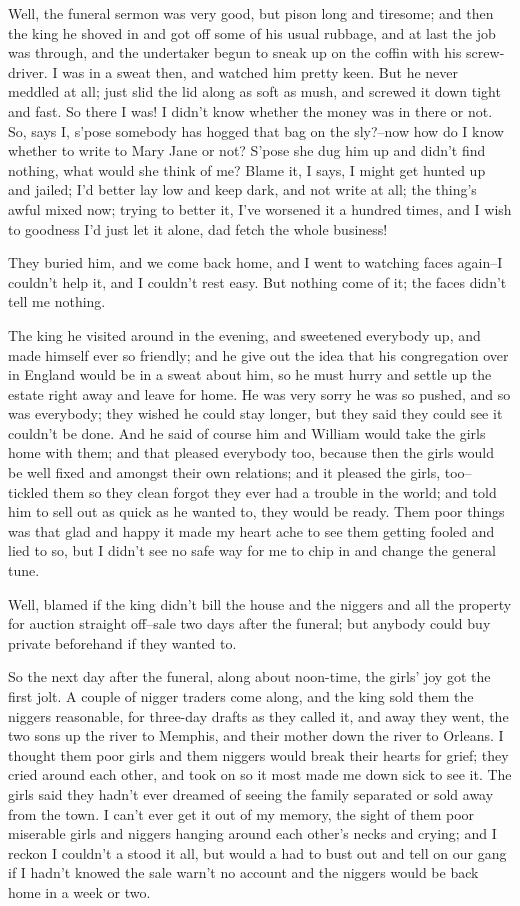 Well, the funeral sermon was very good, but pison long and tiresome; and
then the king he shoved in and got off some of his usual rubbage, and at
last the job was through, and the undertaker begun to sneak up on the
coffin with his screw-driver.  I was in a sweat then, and watched him
pretty keen. But he never meddled at all; just slid the lid along as soft
as mush, and screwed it down tight and fast.  So there I was!  I didn't
know whether the money was in there or not.  So, says I, s'pose somebody
has hogged that bag on the sly?--now how do I know whether to write to
Mary Jane or not? S'pose she dug him up and didn't find nothing, what
would she think of me? Blame it, I says, I might get hunted up and
jailed; I'd better lay low and keep dark, and not write at all; the
thing's awful mixed now; trying to better it, I've worsened it a hundred
times, and I wish to goodness I'd just let it alone, dad fetch the whole
business!

They buried him, and we come back home, and I went to watching faces
again--I couldn't help it, and I couldn't rest easy.  But nothing come
of it; the faces didn't tell me nothing.

The king he visited around in the evening, and sweetened everybody up,
and made himself ever so friendly; and he give out the idea that his
congregation over in England would be in a sweat about him, so he must
hurry and settle up the estate right away and leave for home.  He was
very sorry he was so pushed, and so was everybody; they wished he could
stay longer, but they said they could see it couldn't be done.  And he
said of course him and William would take the girls home with them; and
that pleased everybody too, because then the girls would be well fixed
and amongst their own relations; and it pleased the girls, too--tickled
them so they clean forgot they ever had a trouble in the world; and told
him to sell out as quick as he wanted to, they would be ready.  Them poor
things was that glad and happy it made my heart ache to see them getting
fooled and lied to so, but I didn't see no safe way for me to chip in and
change the general tune.

Well, blamed if the king didn't bill the house and the niggers and all
the property for auction straight off--sale two days after the funeral;
but anybody could buy private beforehand if they wanted to.

So the next day after the funeral, along about noon-time, the girls' joy
got the first jolt.  A couple of nigger traders come along, and the king
sold them the niggers reasonable, for three-day drafts as they called it,
and away they went, the two sons up the river to Memphis, and their
mother down the river to Orleans.  I thought them poor girls and them
niggers would break their hearts for grief; they cried around each other,
and took on so it most made me down sick to see it.  The girls said they
hadn't ever dreamed of seeing the family separated or sold away from the
town.  I can't ever get it out of my memory, the sight of them poor
miserable girls and niggers hanging around each other's necks and crying;
and I reckon I couldn't a stood it all, but would a had to bust out and
tell on our gang if I hadn't knowed the sale warn't no account and the
niggers would be back home in a week or two.

